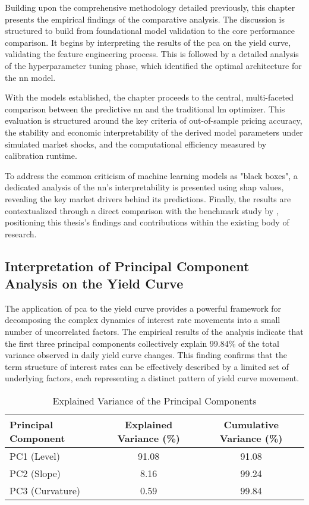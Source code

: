 Building upon the comprehensive methodology detailed previously, this chapter presents the empirical findings of the comparative analysis. The discussion is structured to build from foundational model validation to the core performance comparison. It begins by interpreting the results of the \ac{pca} on the yield curve, validating the feature engineering process. This is followed by a detailed analysis of the hyperparameter tuning phase, which identified the optimal architecture for the \ac{nn} model.

With the models established, the chapter proceeds to the central, multi-faceted comparison between the predictive \ac{nn} and the traditional \ac{lm} optimizer. This evaluation is structured around the key criteria of out-of-sample pricing accuracy, the stability and economic interpretability of the derived model parameters under simulated market shocks, and the computational efficiency measured by calibration runtime.

To address the common criticism of machine learning models as "black boxes", a dedicated analysis of the \ac{nn}'s interpretability is presented using \ac{shap} values, revealing the key market drivers behind its predictions. Finally, the results are contextualized through a direct comparison with the benchmark study by \textcite{hernandez2016model}, positioning this thesis's findings and contributions within the existing body of research.

\subsection{Interpretation of Principal Component Analysis on the Yield Curve}
The application of \ac{pca} to the yield curve provides a powerful framework for decomposing the complex dynamics of interest rate movements into a small number of uncorrelated factors. The empirical results of the analysis indicate that the first three principal components collectively explain 99.84\% of the total variance observed in daily yield curve changes. This finding confirms that the term structure of interest rates can be effectively described by a limited set of underlying factors, each representing a distinct pattern of yield curve movement.

\begin{table}[H]
	\centering
	\caption{Explained Variance of the Principal Components}
	\label{tab:pca_variance}
	\begin{tabular}{lcc}
		\toprule
		Principal Component & Explained Variance (\%) & Cumulative Variance (\%) \\
		\midrule
		PC1 (Level)         & 91.08                   & 91.08                    \\
		PC2 (Slope)         & 8.16                    & 99.24                    \\
		PC3 (Curvature)     & 0.59                    & 99.84                    \\
		\bottomrule
	\end{tabular}
\end{table}

